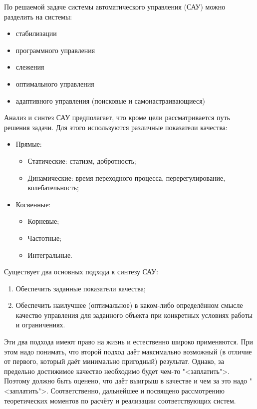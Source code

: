 \documentclass[preprint,russian,a5paper,10pt,twoside,mediummath]{ncc}
\begin{document}
По решаемой задаче системы автоматического управления (САУ) можно разделить на системы:
\begin{itemize}
\item стабилизации
\item программного управления
\item слежения
\item оптимального управления
\item адаптивного управления (поисковые и самонастраивающиеся)
\end{itemize}

Анализ и синтез САУ предполагает, что кроме цели рассматривается путь решения задачи. Для этого используются различные показатели качества:
\begin{itemize}
\item Прямые:
	\begin{itemize}
	\item Статические: статизм, добротность;
	\item Динамические: время переходного процесса, перерегулирование, колебательность;
	\end{itemize}
\pagebreak
\item Косвенные:
	\begin{itemize}
	\item Корневые;
	\item Частотные;
	\item Интегральные.
	\end{itemize}
\end{itemize}

Существует два основных подхода к синтезу САУ:
\begin{enumerate}
\item Обеспечить заданные показатели качества;
\item Обеспечить наилучшее (оптимальное) в каком-либо определённом смысле качество управления для заданного объекта при конкретных условиях работы и ограничениях.
\end{enumerate}

Эти два подхода имеют право на жизнь и естественно широко применяются. При этом надо понимать, что второй подход даёт максимально возможный (в отличие от первого, который даёт минимально пригодный) результат. Однако, за предельно достижимое качество необходимо будет чем-то "<заплатить">. Поэтому должно быть оценено, что даёт выигрыш в качестве и чем за это надо "<заплатить">. Соответственно, дальнейшее и посвящено рассмотрению теоретических моментов по расчёту и реализации соответствующих систем.
\end{document}

